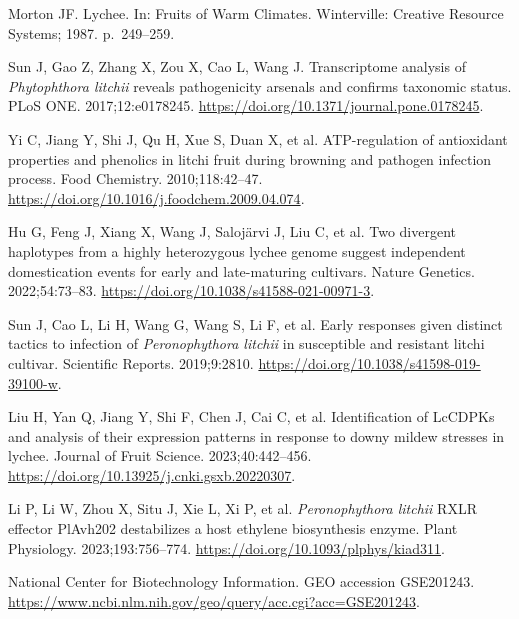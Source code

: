 \documentclass[referee,pdflatex,sn-basic,Numbered]{sn-jnl}
\begin{document}
\begin{enumerate}[label={[\arabic*]},itemsep=2pt,leftmargin=2.6em]
\item Morton JF. Lychee. In: Fruits of Warm Climates. Winterville: Creative Resource Systems; 1987. p.~249--259.

\item Sun J, Gao Z, Zhang X, Zou X, Cao L, Wang J. Transcriptome analysis of \textit{Phytophthora litchii} reveals pathogenicity arsenals and confirms taxonomic status. PLoS ONE. 2017;12:e0178245. \url{https://doi.org/10.1371/journal.pone.0178245}.

\item Yi C, Jiang Y, Shi J, Qu H, Xue S, Duan X, et al. ATP-regulation of antioxidant properties and phenolics in litchi fruit during browning and pathogen infection process. Food Chemistry. 2010;118:42--47. \url{https://doi.org/10.1016/j.foodchem.2009.04.074}.

\item Hu G, Feng J, Xiang X, Wang J, Saloj\"arvi J, Liu C, et al. Two divergent haplotypes from a highly heterozygous lychee genome suggest independent domestication events for early and late-maturing cultivars. Nature Genetics. 2022;54:73--83. \url{https://doi.org/10.1038/s41588-021-00971-3}.

\item Sun J, Cao L, Li H, Wang G, Wang S, Li F, et al. Early responses given distinct tactics to infection of \textit{Peronophythora litchii} in susceptible and resistant litchi cultivar. Scientific Reports. 2019;9:2810. \url{https://doi.org/10.1038/s41598-019-39100-w}.

\item Liu H, Yan Q, Jiang Y, Shi F, Chen J, Cai C, et al. Identification of LcCDPKs and analysis of their expression patterns in response to downy mildew stresses in lychee. Journal of Fruit Science. 2023;40:442--456. \url{https://doi.org/10.13925/j.cnki.gsxb.20220307}.

\item Li P, Li W, Zhou X, Situ J, Xie L, Xi P, et al. \textit{Peronophythora litchii} RXLR effector PlAvh202 destabilizes a host ethylene biosynthesis enzyme. Plant Physiology. 2023;193:756--774. \url{https://doi.org/10.1093/plphys/kiad311}.

\item National Center for Biotechnology Information. GEO accession GSE201243. \url{https://www.ncbi.nlm.nih.gov/geo/query/acc.cgi?acc=GSE201243}.


\end{enumerate}
\end{document}

